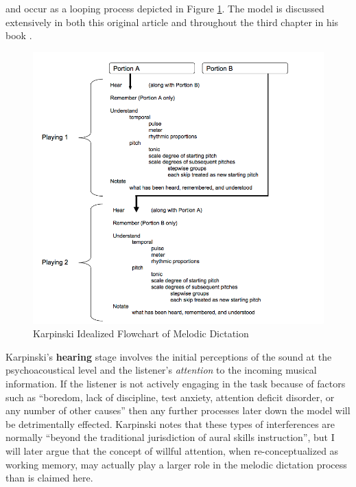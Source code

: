\documentclass[]{book}
\begin{document}
and occur as a looping process depicted in Figure \ref{fig:flowchart}.
The model is discussed extensively in both this original article \citep{karpinskiModelMusicPerception1990} and throughout the third chapter in his book \citep{karpinskiAuralSkillsAcquisition2000}.

\begin{figure}

{\centering \includegraphics[width=1\linewidth]{img/karpinski31} 

}

\caption{Karpinski Idealized Flowchart of Melodic Dictation}\label{fig:flowchart}
\end{figure}

Karpinski's \textbf{hearing} stage involves the initial perceptions of the sound at the psychoacoustical level and the listener's \emph{attention} to the incoming musical information.
If the listener is not actively engaging in the task because of factors such as ``boredom, lack of discipline, test anxiety, attention deficit disorder, or any number of other causes'' then any further processes later down the model will be detrimentally effected.
Karpinski notes that these types of interferences are normally ``beyond the traditional jurisdiction of aural skills instruction'', but I will later argue that the concept of willful attention, when re-conceptualized as working memory, may actually play a larger role in the melodic dictation process than is claimed here.
\end{document}
